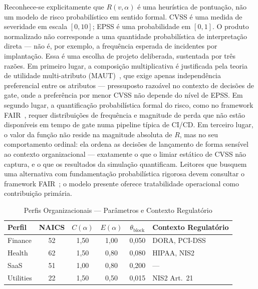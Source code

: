 Reconhece-se explicitamente que $R(v, \alpha)$ é uma heurística de
pontuação, não um modelo de risco probabilístico em sentido formal. CVSS é
uma medida de severidade em escala $[0, 10]$; EPSS é uma probabilidade em
$[0, 1]$. O produto normalizado não corresponde a uma quantidade
probabilística de interpretação direta — não é, por exemplo, a frequência
esperada de incidentes por implantação. Essa é uma escolha de projeto
deliberada, sustentada por três razões. Em primeiro lugar, a composição
multiplicativa é justificada pela teoria de utilidade multi-atributo
(MAUT)~\cite{keeney1993}, que exige apenas independência preferencial entre
os atributos — pressuposto razoável no contexto de decisões de gate, onde a
preferência por menor CVSS não depende do nível de EPSS. Em segundo lugar, a
quantificação probabilística formal do risco, como no framework
FAIR~\cite{jones2005}, requer distribuições de frequência e magnitude de
perda que não estão disponíveis em tempo de gate numa pipeline típica de
CI/CD. Em terceiro lugar, o valor da função não reside na magnitude absoluta
de $R$, mas no seu comportamento ordinal: ela ordena as decisões de
lançamento de forma sensível ao contexto organizacional — exatamente o que o
limiar estático de CVSS não captura, e o que os resultados da simulação
quantificam. Leitores que busquem uma alternativa com fundamentação
probabilística rigorosa devem consultar o framework FAIR~\cite{jones2005}; o
modelo presente oferece tratabilidade operacional como contribuição primária.



\begin{table}[t]
\caption{Perfis Organizacionais — Parâmetros e Contexto Regulatório}
\label{tab:profiles}
\centering
\begin{tabular}{lccccl}
\toprule
\textbf{Perfil} & \textbf{NAICS} & $C(\alpha)$ & $E(\alpha)$ &
$\theta_{\text{block}}$ & \textbf{Contexto Regulatório} \\
\midrule
Finance  & 52 & 1,50 & 1,00 & 0,050 & DORA, PCI-DSS \\
Health   & 62 & 1,50 & 0,80 & 0,080 & HIPAA, NIS2   \\
SaaS     & 51 & 1,00 & 0,80 & 0,200 & —             \\
Utilities& 22 & 1,50 & 0,50 & 0,015 & NIS2 Art.~21  \\
\bottomrule
\end{tabular}
\end{table}

